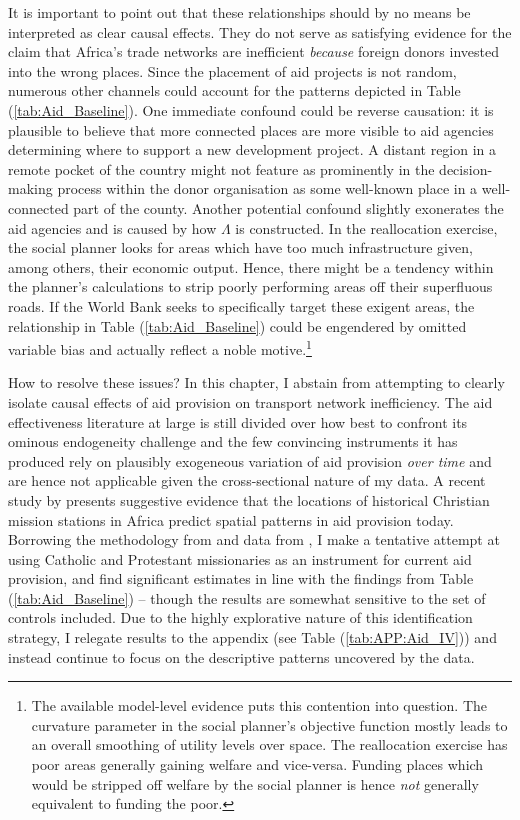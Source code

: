 \documentclass[11pt, oneside]{article}   	%
\let\oldref\ref
\renewcommand{\ref}[1]{(\oldref{#1})}
\begin{document}
It is important to point out that these relationships should by no means be interpreted as clear causal effects. They do not serve as satisfying evidence for the claim that Africa's trade networks are inefficient \emph{because} foreign donors invested into the wrong places. Since the placement of aid projects is not random, numerous other channels could account for the patterns depicted in Table \ref{tab:Aid_Baseline}. One immediate confound could be reverse causation: it is plausible to believe that more connected places are more visible to aid agencies determining where to support a new development project. A distant region in a remote pocket of the country might not feature as prominently in the decision-making process within the donor organisation as some well-known place in a well-connected part of the county. Another potential confound slightly exonerates the aid agencies and is caused by how $\Lambda$ is constructed. In the reallocation exercise, the social planner looks for areas which have too much infrastructure given, among others, their economic output. Hence, there might be a tendency within the planner's calculations to strip poorly performing areas off their superfluous roads. If the World Bank seeks to specifically target these exigent areas, the relationship in Table \ref{tab:Aid_Baseline} could be engendered by omitted variable bias and actually reflect a noble motive.\footnote{The available model-level evidence puts this contention into question. The curvature parameter in the social planner's objective function mostly leads to an overall smoothing of utility levels over space. The reallocation exercise has poor areas generally gaining welfare and vice-versa. Funding places which would be stripped off welfare by the social planner is hence \emph{not} generally equivalent to funding the poor.}

How to resolve these issues? In this chapter, I abstain from attempting to clearly isolate causal effects of aid provision on transport network inefficiency. The aid effectiveness literature at large is still divided over how best to confront its ominous endogeneity challenge \citep{Clemens_CountingChickenswhen_2012} and the few convincing instruments it has produced rely on plausibly exogeneous variation of aid provision \emph{over time} \citep{Nunn_USFoodAid_2014,Dreher_AidChinaGrowth_2017,Galiani_effectaidgrowth_2017} and are hence not applicable given the cross-sectional nature of my data. A recent study by \cite{Alpino_LightingPathInfluence_2017} presents suggestive evidence that the locations of historical Christian mission stations in Africa predict spatial patterns in aid provision today. Borrowing the methodology from \cite{Castello-Climent_HigherEducationProsperity_2017} and data from \cite{Nunn_ReligiousConversionColonial_2010}, I make a tentative attempt at using Catholic and Protestant missionaries as an instrument for current aid provision, and find significant estimates in line with the findings from Table \ref{tab:Aid_Baseline} -- though the results are somewhat sensitive to the set of controls included. Due to the highly explorative nature of this identification strategy, I relegate results to the appendix (see Table \ref{tab:APP:Aid_IV}) and instead continue to focus on the descriptive patterns uncovered by the data.
\end{document}
